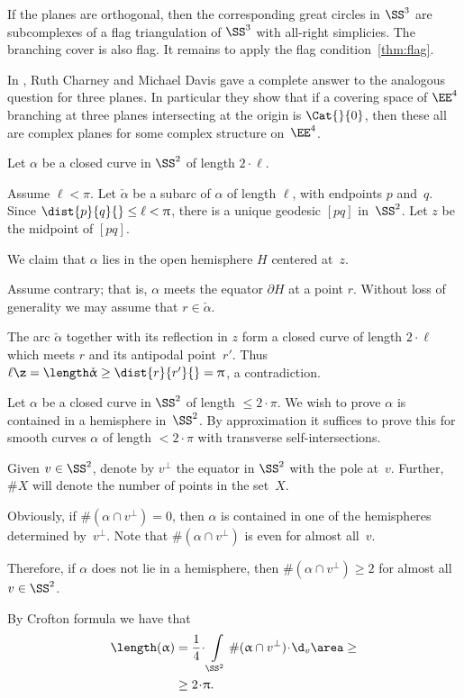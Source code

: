 If the planes are orthogonal, then the corresponding great circles in $\SS^3$ are subcomplexes of a flag triangulation of $\SS^3$ with all-right simplicies.
The branching cover is also flag.
It remains to apply the flag condition~\ref{thm:flag}.\qeds

In \cite{charney-davis-93}, Ruth Charney and Michael Davis
gave a complete answer to the analogous question for three planes.
In particular they show that if a covering space of $\EE^4$
branching at three planes intersecting at the origin is $\Cat{}{0}$, then these all are complex planes for some complex structure on~$\EE^4$.


Let $\alpha$ be a closed curve in $\SS^2$ of length $2\cdot\ell$.

Assume $\ell<\pi$.
Let $\check\alpha$ be a subarc of $\alpha$ of length $\ell$, with endpoints $p$ and~$q$. 
Since $\dist{p}{q}{}\le\ell<\pi$, there is a unique geodesic $[pq]$ in~$\SS^2$.  
Let $z$ be the midpoint of $[pq]$. 

We claim that $\alpha$ lies in the open hemisphere $H$ centered at~$z$.  

Assume contrary; that is, $\alpha$ meets the equator $\partial H$ at a point $r$.
Without loss of generality we may assume that $r\in\check\alpha$.

The arc $\check\alpha$ together with its reflection in $z$ form a closed curve of length $2\cdot \ell$ which meets $r$ and its antipodal point~$r'$.
Thus $\ell\z=\length \check\alpha\ge \dist{r}{r'}{}=\pi$, a contradiction.
\qeds

Let $\alpha$ be a closed curve in  $\SS^2$ of length $\le 2\cdot\pi$.  We wish to prove $\alpha$ is contained in a hemisphere in~$\SS^2$.
By approximation it suffices to prove this for  smooth curves $\alpha$ of length $< 2\cdot\pi$ with transverse self-intersections. 

Given $v\in \SS^2$, denote by $v^\perp$ the equator in $\SS^2$ with the pole at~$v$.
Further, $\# X$ will denote the number of points in the set~$X$.

Obviously,  if $\#(\alpha\cap v^\perp) =0$, then $\alpha$ is contained in one of the hemispheres determined by~$v^\perp$. 
Note that $\#(\alpha\cap v^\perp)$ is even for almost all~$v$.

Therefore, if $\alpha$ does not lie in a hemisphere, then
$\#(\alpha\cap v^\perp) \ge 2$ for almost all $v\in\SS^2$.  

By Crofton formula we have that
\begin{align*}
\length(\alpha)
&=\frac 1 4\cdot \int\limits_{\SS^2}\#(\alpha\cap v^\perp)\cdot \d_v\area\ge
\\
&\ge2\cdot\pi.
\end{align*}
\qedsf



